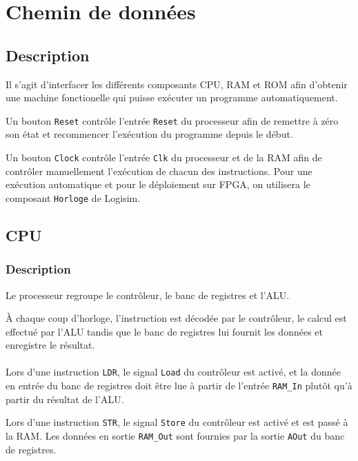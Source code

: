 \documentclass{article}
\begin{document}
    \section{Chemin de données}

    \subsection{Description}

    Il s'agit d'interfacer les différents composants CPU, RAM et ROM afin d'obtenir une machine fonctionelle qui puisse exécuter un programme automatiquement.

    Un bouton \texttt{Reset} contrôle l'entrée \texttt{Reset} du processeur afin de remettre à zéro son état et recommencer l'exécution du programme depuis le début.

    Un bouton \texttt{Clock} contrôle l'entrée \texttt{Clk} du processeur et de la RAM afin de contrôler manuellement l'exécution de chacun des instructions.
    Pour une exécution automatique et pour le déploiement sur FPGA, on utilisera le composant \texttt{Horloge} de Logisim.

    \subsection{CPU}

    \subsubsection{Description}

    Le processeur regroupe le contrôleur, le banc de registres et l'ALU.

    À chaque coup d'horloge, l'instruction est décodée par le contrôleur, le calcul est effectué par l'ALU tandis que le banc de registres lui fournit les données et enregistre le résultat.

    \paragraph{}
    Lors d'une instruction \texttt{LDR}, le signal \texttt{Load} du contrôleur est activé, et la donnée en entrée du banc de registres doit être lue à partir de l'entrée \texttt{RAM\_In} plutôt qu'à partir du résultat de l'ALU.

    Lors d'une instruction \texttt{STR}, le signal \texttt{Store} du contrôleur est activé et est passé à la RAM. Les données en sortie \texttt{RAM\_Out} sont fournies par la sortie \texttt{AOut} du banc de registres.
\end{document}
